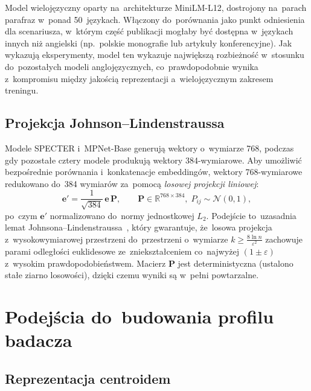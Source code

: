 Model wielojęzyczny oparty na~architekturze MiniLM-L12,
dostrojony na~parach parafraz w~ponad 50~językach.
Włączony do~porównania jako punkt odniesienia dla scenariusza,
w~którym część publikacji mogłaby być dostępna w~językach innych
niż angielski (np.\ polskie monografie lub artykuły konferencyjne).
Jak wykazują eksperymenty, model ten wykazuje największą
rozbieżność w~stosunku do~pozostałych modeli anglojęzycznych,
co~prawdopodobnie wynika z~kompromisu między jakością
reprezentacji a~wielojęzycznym zakresem treningu.

\subsection{Projekcja Johnson--Lindenstraussa}
\label{subsec:jl}

Modele SPECTER i~MPNet-Base generują wektory o~wymiarze 768,
podczas gdy pozostałe cztery modele produkują wektory 384-wymiarowe.
Aby umożliwić bezpośrednie porównania i~konkatenacje embeddingów,
wektory 768-wymiarowe redukowano do~384 wymiarów za~pomocą
\emph{losowej projekcji liniowej}:
\begin{equation}
    \mathbf{e}' = \frac{1}{\sqrt{384}}\,\mathbf{e}\,\mathbf{P},
    \qquad \mathbf{P} \in \mathbb{R}^{768 \times 384},\;
    P_{ij} \sim \mathcal{N}(0,1),
    \label{eq:jl_proj}
\end{equation}
po~czym $\mathbf{e}'$ normalizowano do~normy jednostkowej $L_2$.
Podejście to~uzasadnia lemat Johnsona--Lindenstraussa~\cite{jl1984},
który gwarantuje, że~losowa projekcja z~wysokowymiarowej przestrzeni
do~przestrzeni o~wymiarze $k \geq \frac{8 \ln n}{\varepsilon^2}$
zachowuje parami odległości euklidesowe ze~zniekształceniem
co~najwyżej $(1 \pm \varepsilon)$ z~wysokim prawdopodobieństwem.
Macierz $\mathbf{P}$ jest deterministyczna (ustalono stałe ziarno
losowości), dzięki czemu wyniki są w~pełni powtarzalne.

\section{Podejścia do~budowania profilu badacza}
\label{sec:approaches}

\subsection{Reprezentacja centroidem}
\label{subsec:centroid}

